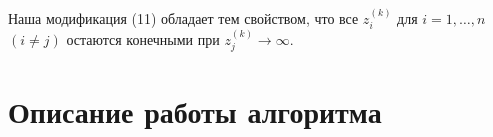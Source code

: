 \documentclass[a4paper,12pt]{article}
\begin{document}
Наша модификация (11) обладает тем свойством, что все $z_{i}^{(k)}$ для $i=1,\dots,n$ $(i\neq j)$ остаются конечными при $z_{j}^{(k)} \to \infty$.


\newpage
\section{Описание работы алгоритма}

    
    
\end{document}
